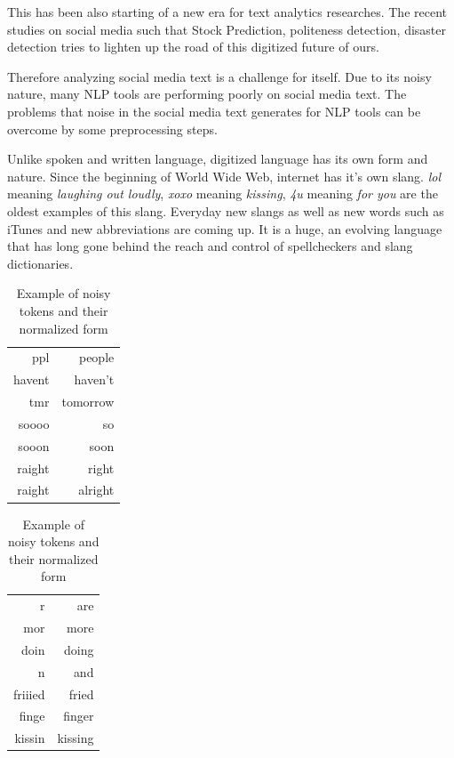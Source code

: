 \documentclass[preprint,review,12pt]{elsarticle}
\begin{document}
This has been also starting of a new era for text analytics researches. The recent studies on social media such that Stock Prediction\cite{DBLP:conf/acl/SiMLLLD13}, politeness detection\cite{DBLP:conf/acl/Danescu-Niculescu-MizilSJLP13}, disaster detection\cite{Sakaki:2010:EST:1772690.1772777} tries to lighten up the road of this digitized future of ours.

Therefore analyzing social media text is a challenge for itself. Due to its noisy nature, many NLP tools are performing poorly on social media text\cite{ritter2010unsupervised}. The problems that noise in the social media text generates for NLP tools can be overcome by some preprocessing steps.

Unlike spoken and written language, digitized language has its own form and nature. Since the beginning of World Wide Web, internet has it's own slang. \textit{lol} meaning \textit{laughing out loudly},  \textit{xoxo} meaning \textit{kissing}, \textit{4u} meaning \textit{for you} are the oldest examples of this slang. Everyday new slangs as well as new words such as iTunes and new abbreviations are coming up. It is a huge, an evolving language that has long gone behind the reach and control of spellcheckers and slang dictionaries.
\begin{table}[tbhp]
\begin{minipage}[c]{.5\linewidth}
\centering
\begin{tabular}[h]{|r|r|}
\hline
ppl & people \\
havent & haven't \\
tmr &   tomorrow \\
soooo &  so \\
sooon &  soon \\
raight & right \\
raight & alright \\
\hline
\end{tabular}
\end{minipage}
\begin{minipage}[c]{.5\linewidth}
\centering
\begin{tabular}[h]{|r|r|}
\hline
r  &  are \\
mor &    more \\
doin &   doing \\
n &      and \\
friiied &  fried \\
finge &  finger \\
kissin & kissing \\
\hline
\end{tabular}
\end{minipage}
\caption{Example of noisy tokens and their normalized form}
\label{tab:normalizations}
\end{table}
\end{document}
